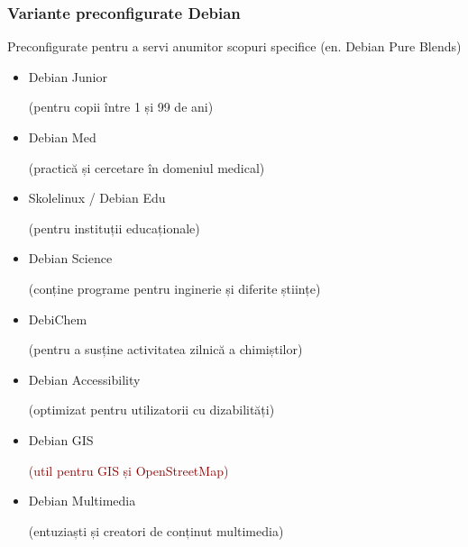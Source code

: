 \documentclass[xcolor=dvipsnames]{beamer}
\begin{document}
\begin{frame}
\frametitle{Variante preconfigurate Debian}
\begin{block}
{Preconfigurate pentru a servi anumitor scopuri specifice}
(en. Debian Pure Blends)\\
\begin{itemize}
\item Debian Junior
	\begin{footnotesize}
		(pentru copii între 1 și 99 de ani)
	\end{footnotesize} 
\item Debian Med
	\begin{footnotesize}
		(practică și cercetare în domeniul medical)
	\end{footnotesize} 
\item Skolelinux / Debian Edu
	\begin{footnotesize}
		(pentru instituții educaționale)
	\end{footnotesize} 
\item Debian Science
	\begin{footnotesize}
		(conține programe pentru inginerie și diferite științe)
	\end{footnotesize} 
\item DebiChem
	\begin{footnotesize}
		(pentru a susține activitatea zilnică a chimiștilor)
	\end{footnotesize} 
\item Debian Accessibility
	\begin{footnotesize}
		(optimizat pentru utilizatorii cu dizabilități)
	\end{footnotesize} 
\item Debian GIS
	\begin{footnotesize}
		\textcolor{darkred}{(util pentru GIS și OpenStreetMap)}
	\end{footnotesize} 
\item \textcolor{fade}{Debian Multimedia}
	\begin{footnotesize}
		\textcolor{fade}{(entuziaști și creatori de conținut multimedia)}
	\end{footnotesize} 
\end{itemize}
\end{block}
\end{frame}
\end{document}
